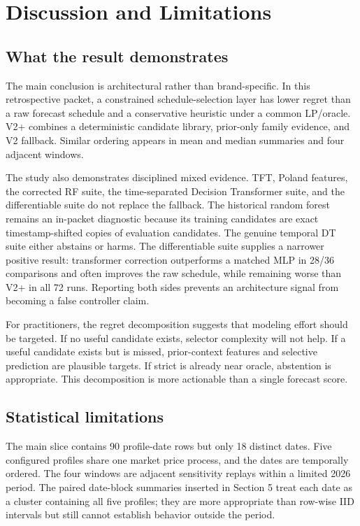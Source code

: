 \section{Discussion and Limitations}

\subsection{What the result demonstrates}

The main conclusion is architectural rather than brand-specific. In this retrospective packet, a constrained schedule-selection layer has lower regret than a raw forecast schedule and a conservative heuristic under a common LP/oracle. V2+ combines a deterministic candidate library, prior-only family evidence, and V2 fallback. Similar ordering appears in mean and median summaries and four adjacent windows.

The study also demonstrates disciplined mixed evidence. TFT, Poland features, the corrected RF suite, the time-separated Decision Transformer suite, and the differentiable suite do not replace the fallback. The historical random forest remains an in-packet diagnostic because its training candidates are exact timestamp-shifted copies of evaluation candidates. The genuine temporal DT suite either abstains or harms. The differentiable suite supplies a narrower positive result: transformer correction outperforms a matched MLP in 28/36 comparisons and often improves the raw schedule, while remaining worse than V2+ in all 72 runs. Reporting both sides prevents an architecture signal from becoming a false controller claim.

For practitioners, the regret decomposition suggests that modeling effort should be targeted. If no useful candidate exists, selector complexity will not help. If a useful candidate exists but is missed, prior-context features and selective prediction are plausible targets. If strict is already near oracle, abstention is appropriate. This decomposition is more actionable than a single forecast score.

\subsection{Statistical limitations}

The main slice contains 90 profile-date rows but only 18 distinct dates. Five configured profiles share one market price process, and the dates are temporally ordered. The four windows are adjacent sensitivity replays within a limited 2026 period. The paired date-block summaries inserted in Section 5 treat each date as a cluster containing all five profiles; they are more appropriate than row-wise IID intervals but still cannot establish behavior outside the period.

